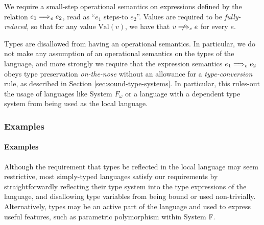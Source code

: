 We require a small-step operational semantics on expressions defined by the relation $e_1 \localstep e_2$, read as ``$e_1$ steps-to $e_2$''.
Values are required to be \emph{fully-reduced}, so that for any value $\text{Val}(v)$, we have that $v \nlocalstep e$ for every $e$.

Types are disallowed from having an operational semantics.
In particular, we do not make any assumption of an operational semantics on the types of the language, and more strongly we require that the expression semantics $e_1 \localstep e_2$ obeys type preservation \emph{on-the-nose} without an allowance for a \emph{type-conversion} rule, as described in Section \ref{sec:sound-type-systems}.
In particular, this rules-out the usage of languages like System $F_\omega$ or a language with a dependent type system from being used as the local language.

\iftr\subsubsection{Examples}\else\paragraph{Examples}\fi
\label{sec:loc-lang-examples}

Although the requirement that types be reflected in the local language may seem restrictive, most simply-typed languages satisfy our requirements by straightforwardly reflecting their type system into the type expressions of the language, and disallowing type variables from being bound or used non-trivially.
Alternatively, types may be an active part of the language and used to express useful features, such as parametric polymorphism within System F.

